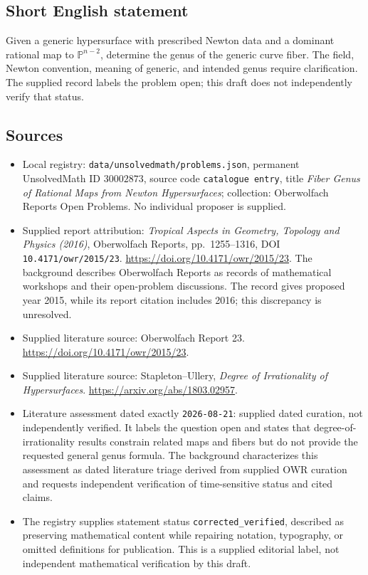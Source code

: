 \documentclass[11pt]{article}
\newcommand{\PP}{\mathbb{P}}
\begin{document}
\subsection{Short English statement}
Given a generic hypersurface with prescribed Newton data and a dominant rational map to \(\PP^{n-2}\), determine the genus of the generic curve fiber. The field, Newton convention, meaning of generic, and intended genus require clarification. The supplied record labels the problem open; this draft does not independently verify that status.
\subsection{Sources}
\begin{itemize}
\item Local registry: \texttt{data/unsolvedmath/problems.json}, permanent UnsolvedMath ID \(30002873\), source code \texttt{catalogue entry}, title \emph{Fiber Genus of Rational Maps from Newton Hypersurfaces}; collection: Oberwolfach Reports Open Problems. No individual proposer is supplied.
\item Supplied report attribution: \emph{Tropical Aspects in Geometry, Topology and Physics (2016)}, Oberwolfach Reports, pp.\ 1255--1316, DOI \texttt{10.4171/owr/2015/23}. \url{https://doi.org/10.4171/owr/2015/23}. The background describes Oberwolfach Reports as records of mathematical workshops and their open-problem discussions. The record gives proposed year 2015, while its report citation includes 2016; this discrepancy is unresolved.
\item Supplied literature source: Oberwolfach Report 23. \url{https://doi.org/10.4171/owr/2015/23}.
\item Supplied literature source: Stapleton--Ullery, \emph{Degree of Irrationality of Hypersurfaces}. \url{https://arxiv.org/abs/1803.02957}.
\item Literature assessment dated exactly \texttt{2026-08-21}: supplied dated curation, not independently verified. It labels the question open and states that degree-of-irrationality results constrain related maps and fibers but do not provide the requested general genus formula. The background characterizes this assessment as dated literature triage derived from supplied OWR curation and requests independent verification of time-sensitive status and cited claims.
\item The registry supplies statement status \texttt{corrected\_verified}, described as preserving mathematical content while repairing notation, typography, or omitted definitions for publication. This is a supplied editorial label, not independent mathematical verification by this draft.
\end{itemize}
\end{document}

